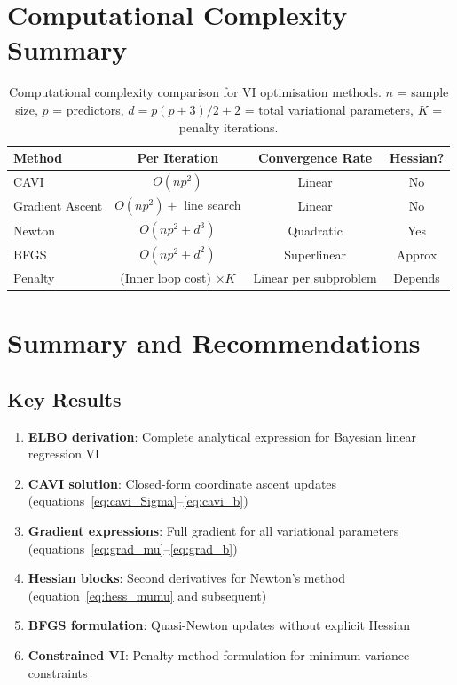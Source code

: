 \documentclass[11pt]{article}
\begin{document}
\section{Computational Complexity Summary}

\begin{table}[h]
\centering
\begin{tabular}{lccc}
\hline
\textbf{Method} & \textbf{Per Iteration} & \textbf{Convergence Rate} & \textbf{Hessian?} \\
\hline
CAVI & $O(np^2)$ & Linear & No \\
Gradient Ascent & $O(np^2) + $ line search & Linear & No \\
Newton & $O(np^2 + d^3)$ & Quadratic & Yes \\
BFGS & $O(np^2 + d^2)$ & Superlinear & Approx \\
Penalty & (Inner loop cost) $\times K$ & Linear per subproblem & Depends \\
\hline
\end{tabular}
\caption{Computational complexity comparison for VI optimisation methods. $n$ = sample size, $p$ = predictors, $d = p(p+3)/2 + 2$ = total variational parameters, $K$ = penalty iterations.}
\end{table}

\section{Summary and Recommendations}

\subsection{Key Results}

\begin{enumerate}
\item \textbf{ELBO derivation}: Complete analytical expression for Bayesian linear regression VI
\item \textbf{CAVI solution}: Closed-form coordinate ascent updates (equations~\ref{eq:cavi_Sigma}--\ref{eq:cavi_b})
\item \textbf{Gradient expressions}: Full gradient for all variational parameters (equations~\ref{eq:grad_mu}--\ref{eq:grad_b})
\item \textbf{Hessian blocks}: Second derivatives for Newton's method (equation~\ref{eq:hess_mumu} and subsequent)
\item \textbf{BFGS formulation}: Quasi-Newton updates without explicit Hessian
\item \textbf{Constrained VI}: Penalty method formulation for minimum variance constraints
\end{enumerate}
\end{document}
